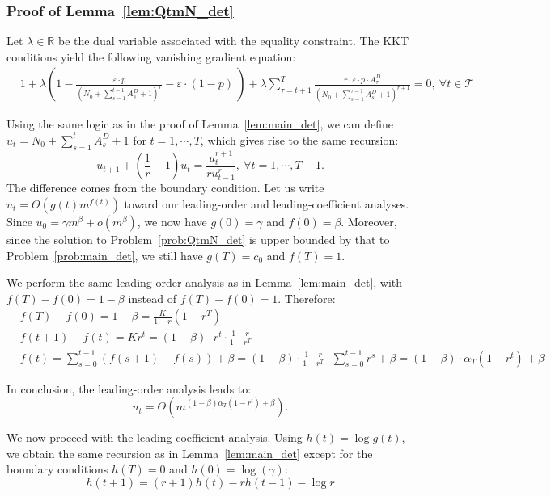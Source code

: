 \documentclass[nonblindrev]{informs3noheader}
\def\R{\mathbb{R}}
\def\calT{\mathcal{T}}
\begin{document}
\subsubsection*{Proof of Lemma~\ref{lem:QtmN_det}}

Let $\lambda\in\R$ be the dual variable associated with the equality constraint. The KKT conditions yield the following vanishing gradient equation:
\begin{align*}
& 1+\lambda\left(1 - \frac{\varepsilon\cdot p}{\left(N_0+ \sum_{s=1}^{t-1} A^{D}_s +1\right)^r} - \varepsilon\cdot(1-p)\ \right)+\lambda\sum_{\tau=t+1}^T\frac{r\cdot\varepsilon \cdot p\cdot A^{D}_\tau}{\left(N_0 +\sum_{s=1}^{\tau-1} A^{D}_s +1\right)^{r+1}}=0,\ \forall t\in\calT
\end{align*}

Using the same logic as in the proof of Lemma~\ref{lem:main_det}, we can define $u_t = N_0 + \sum_{s=1}^t A^{D}_s + 1$ for $t=1,\cdots,T$, which gives rise to the same recursion:
\begin{equation*}
    u_{t+1} + \left(\frac{1}{r}-1\right)u_t = \frac{u_t^{r+1}}{ru_{t-1}^r},\ \forall t=1,\cdots,T-1.
\end{equation*}
The difference comes from the boundary condition. 
Let us write $u_t = \Theta(g(t)m^{f(t)})$ toward our leading-order and leading-coefficient analyses. Since $u_0 = \gamma m^\beta + o(m^\beta)$, we now have $g(0)=\gamma$ and $f(0)=\beta$. Moreover, since the solution to Problem~\eqref{prob:QtmN_det} is upper bounded by that to Problem~\eqref{prob:main_det}, we still have $g(T)=c_0$ and $f(T)=1$.

We perform the same leading-order analysis as in Lemma~\ref{lem:main_det}, with $f(T)-f(0)=1-\beta$ instead of $f(T)-f(0)=1$. Therefore:
\begin{align*}
	& f(T)-f(0)=1-\beta=\frac{K}{1-r}\left(1-r^T\right)\\
	& f(t+1)-f(t)=Kr^t=(1-\beta)\cdot r^{t}\cdot\frac{1-r}{1-r^T}\\
	& f(t)=\sum_{s=0}^{t-1}(f(s+1)-f(s))+\beta=(1-\beta)\cdot\frac{1-r}{1-r^T}\cdot\sum_{s=0}^{t-1}r^s+\beta=(1-\beta)\cdot\alpha_T(1-r^t)+\beta
\end{align*}

In conclusion, the leading-order analysis leads to:
$$u_t=\Theta\left(m^{(1-\beta)\alpha_T\left(1-r^t\right) + \beta}\right).$$

We now proceed with the leading-coefficient analysis. Using $h(t)=\log g(t)$, we obtain the same recursion as in Lemma~\ref{lem:main_det} except for the boundary conditions $h(T)=0$ and $h(0)=\log(\gamma)$:
\[h(t+1) = (r+1)h(t)-rh(t-1)-\log r\]
\end{document}
